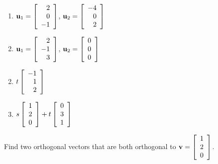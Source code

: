 \begin{multicols}{2}
\begin{ex}
\begin{enumerate}[label={\alph*.}]
\item $\textbf{u}_{1} = \left[
\begin{array}{r}
2\\
0\\
-1
\end{array}
\right]$, 
$\textbf{u}_{2} = \left[
\begin{array}{r}
-4\\
0\\
2
\end{array}
\right]
$

\item $\textbf{u}_{1} = \left[
\begin{array}{r}
2\\
-1\\
3
\end{array}
\right]$, 
$\textbf{u}_{2} = \left[
\begin{array}{r}
0\\
0\\
0
\end{array}
\right]
$


\end{enumerate}
\begin{sol}
\begin{enumerate}[label={\alph*.}]
\setcounter{enumi}{1}
\item  $t \left[
\begin{array}{r}
-1\\
1\\
2
\end{array}
\right]
$

\setcounter{enumi}{3}
\item $s \left[
\begin{array}{r}
1\\
2\\
0
\end{array}
\right]
+
t \left[
\begin{array}{r}
0\\
3\\
1
\end{array}
\right]
$


\end{enumerate}
\end{sol}
\end{ex}

\begin{ex}
Find two orthogonal vectors that are both orthogonal to $\textbf{v} = \left[
\begin{array}{r}
1\\
2\\
0
\end{array}
\right]$.
\end{ex}


\end{multicols}
